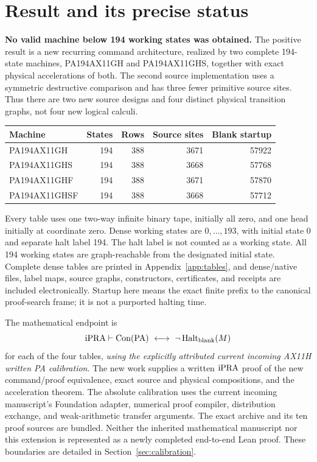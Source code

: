 \section{Result and its precise status}

\textbf{No valid machine below 194 working states was obtained.}
The positive result is a new recurring command architecture, realized by
two complete 194-state machines, PA194AX11GH and PA194AX11GHS, together
with exact physical accelerations of both. The second source implementation
uses a symmetric destructive comparison and has three fewer primitive
source sites. Thus there are two new source designs and four distinct
physical transition graphs, not four new logical calculi.

\begin{center}\small
\begin{tabular}{lrrrr}
\toprule
Machine & States & Rows & Source sites & Blank startup\\
\midrule
PA194AX11GH & 194 & 388 & 3671 & 57922\\
PA194AX11GHS & 194 & 388 & 3668 & 57768\\
PA194AX11GHF & 194 & 388 & 3671 & 57870\\
PA194AX11GHSF & 194 & 388 & 3668 & 57712\\
\bottomrule
\end{tabular}
\end{center}
Every table uses one two-way infinite binary tape, initially all zero,
and one head initially at coordinate zero. Dense working states are
$0,\ldots,193$, with initial state 0 and separate halt label 194.
The halt label is not counted as a working state. All 194 working states
are graph-reachable from the designated initial state. Complete dense
tables are printed in Appendix~\ref{app:tables}, and dense/native files,
label maps, source graphs, constructors, certificates, and receipts are
included electronically. Startup here means the exact finite prefix to
the canonical proof-search frame; it is not a purported halting time.

The mathematical endpoint is
\[
 \mathrm{iPRA}\vdash\operatorname{Con}(\mathrm{PA})\ \longleftrightarrow\
             \neg\operatorname{Halt}_{\mathrm{blank}}(M)
\]
for each of the four tables, \emph{using the explicitly attributed current
incoming AX11H written PA calibration}. The new work supplies a written
$\mathrm{iPRA}$ proof of the new command/proof equivalence, exact source and
physical compositions, and the acceleration theorem. The absolute
calibration uses the current incoming manuscript's Foundation adapter,
numerical proof compiler, distribution exchange, and weak-arithmetic
transfer arguments. The exact archive and its ten proof sources are
bundled. Neither the inherited mathematical manuscript nor this extension
is represented as a newly completed end-to-end Lean proof. These boundaries
are detailed in Section~\ref{sec:calibration}.

